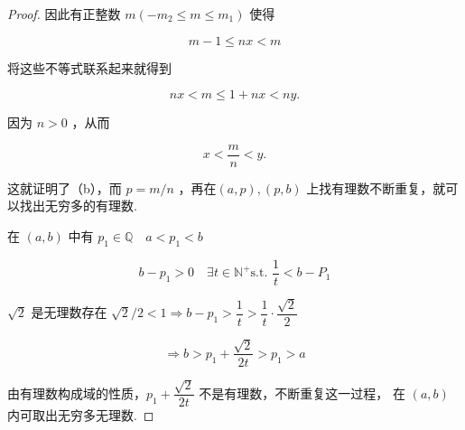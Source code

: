 \begin{proof}
	
	因此有正整数 $m\left(-m_2 \leqslant m \leqslant m_1\right)$ 使得
	
	$$
	m-1 \leqslant n x<m
	$$
	
	
	将这些不等式联系起来就得到
	
	$$
	n x<m \leqslant 1+n x<n y .
	$$
	
	
	因为 $n>0$ ，从而
	
	$$
	x<\dfrac{m}{n}<y .
	$$
	
	
	这就证明了（b），而 $p=m / n$ ，再在$(a,p),(p,b)$
	上找有理数不断重复，就可以找出无穷多的有理数.
	
	在 $(a, b)$ 中有 $p_1 \in \mathbb{Q} \quad a<p_1<b$
	
	$$
	b-p_1>0 \quad \exists t \in \mathbb{N}^{+} \text {s.t. } \dfrac{1}{t}<b-P_1
	$$
	
	$\sqrt{2}$ 是无理数存在 $\sqrt{2} / 2<1 \Rightarrow b-p_1>\dfrac{1}{t}>\dfrac{1}{t} \cdot \dfrac{\sqrt{2}}{2}$
	
	$$
	\Rightarrow b>p_1+\dfrac{\sqrt{2}}{2 t}>p_1>a
	$$
	
	
	由有理数构成域的性质，$p_1+\dfrac{\sqrt{2}}{2 t}$ 不是有理数，不断重复这一过程， 在 $(a, b)$ 内可取出无穷多无理数.
\end{proof}

